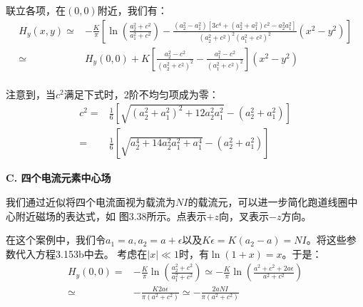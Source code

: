 联立各项，在$(0,0)$附近，我们有：
\begin{equation}
\begin{split}
H_{y}(x,y)\simeq&-\frac{K}{\pi}\left[\ln(\frac{a_{2}^{2}+c^{2}}{a_{1}^{2}+c^{2}})-\frac{(a_{2}^{2}-a_{1}^{2})[3c^{4}+(a_{2}^{2}+a_{1}^{2})c^{2}-a_{2}^{2}a_{1}^{2}]}{(a_{2}^{2}+c^{2})^{2}(a_{1}^{2}+c^{2})^{2}}(x^{2}-y^{2})\right]\\
\simeq& H_{y}(0,0)+K\left[\frac{a_{2}^{2}-c^{2}}{(a_{2}^{2}+c^{2})^{2}}-\frac{a_{1}^{2}-c^{2}}{(a_{1}^{2}+c^{2})^{2}}\right](x^{2}-y^{2})\\%
\end{split}
\end{equation}

注意到，当$c^2$满足下式时，2阶不均匀项成为零：
\begin{equation*}
\begin{split}
c^{2}=&\frac{1}{6}[\sqrt{(a_{2}^{2}+a_{1}^{2})^{2}+12a_{2}^{2}a_{1}^{2}}-(a_{2}^{2}+a_{1}^{2})]\\
=&\frac{1}{6}[\sqrt{a_{2}^{4}+14a_{2}^{2}a_{1}^{2}+a_{1}^{4}}-(a_{2}^{2}+a_{1}^{2})]%
\end{split}\tag{3.156b}
\end{equation*}

\textbf{C. 四个电流元素中心场}

我们通过近似将四个电流面视为载流为$NI$的载流元，可以进一步简化跑道线圈中心附近磁场的表达式，如
图3.38所示。点表示$+z$向，叉表示$-z$方向。

在这个案例中，我们令$a_1=a,a_2=a+\epsilon$以及$K\epsilon=K(a_2-a)=NI$。将这些参数代入方程3.153b中去。
考虑在$|x|\ll 1$时，有$\ln(1+x)=x$。于是：
\begin{equation}
\begin{split}
H_{y}(0,0)=&-\frac{K}{\pi}\ln(\frac{a_{2}^{2}+c^{2}}{a_{1}^{2}+c^{2}})\simeq-\frac{K}{\pi}\ln(\frac{a^{2}+c^{2}+2a\epsilon}{a^{2}+c^{2}})\\
\simeq&-\frac{K2a\epsilon}{\pi(a^{2}+c^{2})}\simeq-\frac{2aNI}{\pi(a^{2}+c^{2})}%
\end{split}
\end{equation}

